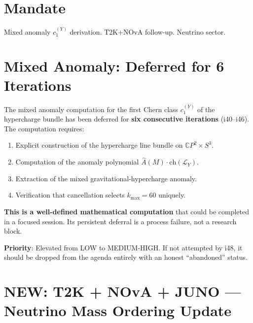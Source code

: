 \documentclass[11pt,a4paper]{article}
\newcommand{\NEW}{\textcolor{dfdblue}{\textbf{NEW}}}
\newcommand{\CP}{\mathbb{C}P}
\begin{document}
\section{Mandate}

Mixed anomaly $c_1^{(Y)}$ derivation. T2K+NOvA follow-up. Neutrino sector.

\section{Mixed Anomaly: Deferred for 6 Iterations}

\begin{tcolorbox}[colback=red!5!white, colframe=red!60!black,
  title={HONEST ASSESSMENT: Mixed Anomaly Deferred Since i40}]

The mixed anomaly computation for the first Chern class $c_1^{(Y)}$ of the hypercharge bundle has been deferred for \textbf{six consecutive iterations} (i40--i46). The computation requires:
\begin{enumerate}
\item Explicit construction of the hypercharge line bundle on $\CP^2 \times S^3$.
\item Computation of the anomaly polynomial $\hat{A}(M) \cdot \mathrm{ch}(\mathcal{L}_Y)$.
\item Extraction of the mixed gravitational-hypercharge anomaly.
\item Verification that cancellation selects $k_{\max} = 60$ uniquely.
\end{enumerate}

\textbf{This is a well-defined mathematical computation} that could be completed in a focused session. Its persistent deferral is a process failure, not a research block.

\textbf{Priority}: Elevated from LOW to MEDIUM-HIGH. If not attempted by i48, it should be dropped from the agenda entirely with an honest ``abandoned'' status.
\end{tcolorbox}

\section{\NEW: T2K + NOvA + JUNO --- Neutrino Mass Ordering Update}
\end{document}

